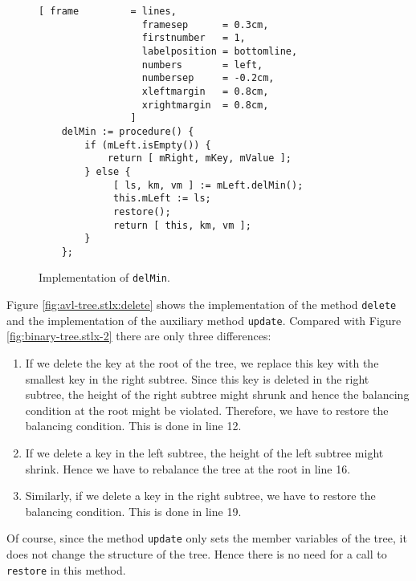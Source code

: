 \begin{figure}[!ht]
\centering
\begin{Verbatim}[ frame         = lines, 
                  framesep      = 0.3cm, 
                  firstnumber   = 1,
                  labelposition = bottomline,
                  numbers       = left,
                  numbersep     = -0.2cm,
                  xleftmargin   = 0.8cm,
                  xrightmargin  = 0.8cm,
                ]
    delMin := procedure() {
        if (mLeft.isEmpty()) { 
            return [ mRight, mKey, mValue ]; 
        } else {
             [ ls, km, vm ] := mLeft.delMin();
             this.mLeft := ls;
             restore();
             return [ this, km, vm ];
        }
    };
\end{Verbatim}
\vspace*{-0.3cm}
\caption{Implementation of \texttt{delMin}.}
\label{fig:avl-tree.stlx:delMin}
\end{figure}

\pagebreak
Figure \ref{fig:avl-tree.stlx:delete} shows the implementation of the method \texttt{delete} and the
implementation of the auxiliary method \texttt{update}.  Compared with Figure
\ref{fig:binary-tree.stlx-2} there are only three differences:
\begin{enumerate}
\item If we delete the key at the root of the tree, we replace this key with the smallest key in the
      right subtree.  Since this key is deleted in the right subtree, the height of the right
      subtree might shrunk and hence the balancing condition at the root might be violated.
      Therefore, we have to restore the balancing condition.  This is done in line 12.
\item If we delete a key in the left subtree, the height of the left subtree might shrink.
      Hence we have to rebalance the tree at the root in line 16.
\item Similarly, if we delete a key in the right subtree, we have to restore the balancing
      condition.  This is done in line 19.
\end{enumerate}
Of course, since the method \texttt{update} only sets the member variables of the tree, it does not
change the structure of the tree.  Hence there is no need for a call to \texttt{restore} in this method.

